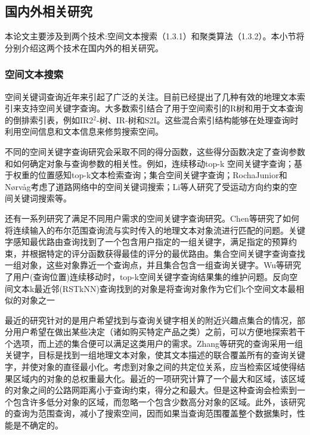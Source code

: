 \subsection{国内外相关研究}
本论文主要涉及到两个技术:空间文本搜索（1.3.1）和聚类算法（1.3.2）。本小节将分别介绍这两个技术在国内外的相关研究。


\subsubsection{空间文本搜索}
空间关键词查询近年来引起了广泛的关注。目前已经提出了几种有效的地理文本索引来支持空间关键字查询。大多数索引结合了用于空间索引的R树和用于文本查询的倒排索引表，例如IR2$^2$-树\cite{DBLP:conf/icde/FelipeHR08}、IR-树\cite{DBLP:journals/vldb/WuCJ12}和S2I\cite{DBLP:conf/ssd/RochaGJN11}。这些混合索引结构能够在处理查询时利用空间信息和文本信息来修剪搜索空间。

不同的空间关键字查询研究会采取不同的得分函数，这些得分函数决定了查询参数和如何确定对象与查询参数的相关性。例如，连续移动top-k 空间关键字查询\cite{DBLP:journals/tods/WuYJ13, DBLP:conf/icde/WuYJC11}；基于权重的位置感知top-k文本检索查询\cite{DBLP:journals/pvldb/CaoCJ10}；集合空间关键字查询\cite{DBLP:conf/sigmod/CaoCJO11}；RochaJunior和Nørvåg\cite{DBLP:conf/edbt/Rocha-JuniorN12}考虑了道路网络中的空间关键词搜索；Li等人\cite{DBLP:conf/icde/LiFX12}研究了受运动方向约束的空间关键词搜索等。

还有一系列研究了满足不同用户需求的空间关键字查询研究。Chen等\cite{DBLP:conf/sigmod/ChenCC13}研究了如何将连续输入的布尔范围查询流与实时传入的地理文本对象流进行匹配的问题。关键字感知最优路由查询\cite{DBLP:journals/pvldb/CaoCCX12}找到了一个包含用户指定的一组关键字，满足指定的预算约束，并根据特定的评分函数获得最佳的评分的最优路由。集合空间关键字查询\cite{DBLP:journals/tods/CaoCGJO15,DBLP:conf/sigmod/CaoCJO11,DBLP:conf/sigmod/LongWWF13}查找一组对象，这些对象靠近一个查询点，并且集合包含一组查询关键字。Wu等\cite{DBLP:journals/tods/WuYJ13, DBLP:conf/icde/WuYJC11}研究了用户(查询位置)连续移动时，top-k空间关键字查询结果集的维护问题。反向空间文本k最近邻(RSTkNN)查询\cite{DBLP:conf/sigmod/LuLC11}找到的对象是将查询对象作为它们k个空间文本最相似的对象之一

最近的研究\cite{DBLP:journals/pvldb/BoghSJ13,DBLP:journals/vldb/SkovsgaardJ15}针对的是用户希望找到与查询关键字相关的附近兴趣点集合的情况，部分用户希望在做出某些决定（诸如购买特定产品之类）之前，可以方便地探索若干个选项，而上述的集合便可以满足这类用户的需求。Zhang等\cite{DBLP:conf/icde/ZhangOT10, DBLP:conf/icde/ZhangCMTK09}研究的查询采用一组关键字，目标是找到一组地理文本对象，使其文本描述的联合覆盖所有的查询关键字，并使对象的直径最小化。考虑到对象之间的共定位关系，应当检索区域使得结果区域内的对象的总权重最大化\cite{DBLP:journals/pvldb/ChoiCT12,DBLP:conf/cikm/LiuYS11,DBLP:journals/pvldb/TaoHCC13}。最近的一项研究\cite{DBLP:journals/pvldb/CaoCJY14}计算了一个最大和区域，该区域的对象之间的公路网距离小于查询约束，得分之和最大。但是这种查询会检索到一个包含许多低分对象的区域，而忽略一个包含少数高分对象的区域。此外，该研究的查询为范围查询，减小了搜索空间，因而如果当查询范围覆盖整个数据集时，性能是不确定的。

